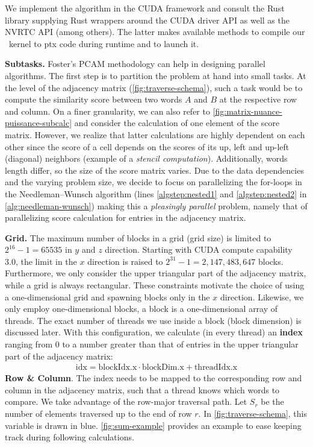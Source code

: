 We implement the algorithm in the CUDA framework and consult the  Rust library supplying Rust wrappers around the CUDA driver API as well as the NVRTC API (among others). The latter makes available methods to compile our \Cpp~kernel to \gls{ptx} code during runtime and to launch it.

\textbf{Subtasks.} Foster's PCAM methodology \cite{foster} can help in designing parallel algorithms. The first step is to partition the problem at hand into small tasks. At the level of the adjacency matrix (\autoref{fig:traverse-schema}), such a task would be to compute the similarity score between two words $A$ and $B$ at the respective row and column. On a finer granularity, we can also refer to \autoref{fig:matrix-nuance-puissance-subcalc} and consider the calculation of one element of the score matrix. However, we realize that latter calculations are highly dependent on each other since the score of a cell depends on the scores of its up, left and up-left (diagonal) neighbors (example of a \textit{stencil computation}). Additionally, words length differ, so the size of the score matrix varies. Due to the data dependencies and the varying problem size, we decide to focus on parallelizing the for-loops in the Needleman–Wunsch algorithm (lines \ref{algstep:nested1} and \ref{algstep:nested2} in \autoref{alg:needleman-wunsch}) making this a \textit{pleasingly parallel} problem, namely that of parallelizing score calculation for entries in the adjacency matrix.

\textbf{Grid.} The maximum number of blocks in a grid (grid size) is limited to $2^{16} - 1 = 65535$ in $y$ and $z$ direction. Starting with CUDA compute capability 3.0, the limit in the $x$ direction is raised to $2^{31} - 1 = 2,147,483,647$ blocks. Furthermore, we only consider the upper triangular part of the adjacency matrix, while a grid is always rectangular. These constraints motivate the choice of using a one-dimensional grid and spawning blocks only in the $x$ direction. Likewise, we only employ one-dimensional blocks, \ie a block is a one-dimensional array of threads. The exact number of threads we use inside a block (block dimension) is discussed later. With this configuration, we calculate (in every thread) an \textbf{index} ranging from $0$ to a number greater than that of entries in the upper triangular part of the adjacency matrix:
\begin{align}
    \text{idx} = \text{blockIdx.x} \cdot \text{blockDim.x} + \text{threadIdx.x}
    \label{eq:idx}
\end{align}
\textbf{Row \& Column}. The index  needs to be mapped to the corresponding row and column in the adjacency matrix, such that a thread knows which words to compare. We take advantage of the row-major traversal path. Let $S_r$ be the number of elements traversed up to the end of row $r$. In \autoref{fig:traverse-schema}, this variable is drawn in blue. \autoref{fig:sum-example} provides an example to ease keeping track during following calculations.

